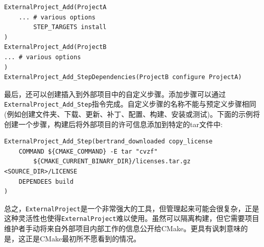 \begin{lstlisting}[style=styleCMake]
ExternalProject_Add(ProjectA
	... # various options
		STEP_TARGETS install
)
ExternalProject_Add(ProjectB
... # various options
)
ExternalProject_Add_StepDependencies(ProjectB configure ProjectA)
\end{lstlisting}

最后，还可以创建插入到外部项目中的自定义步骤。添加步骤可以通过\texttt{ExternalProject\_Add\_Step}指令完成。自定义步骤的名称不能与预定义步骤相同(例如创建文件夹、下载、更新、补丁、配置、构建、安装或测试)。下面的示例将创建一个步骤，构建后将外部项目的许可信息添加到特定的tar文件中:

\begin{lstlisting}[style=styleCMake]
ExternalProject_Add_Step(bertrand_downloaded copy_license
	COMMAND ${CMAKE_COMMAND} -E tar "cvzf"
		${CMAKE_CURRENT_BINARY_DIR}/licenses.tar.gz <SOURCE_DIR>/LICENSE
	DEPENDEES build
)
\end{lstlisting}

总之，\texttt{ExternalProject}是一个非常强大的工具，但管理起来可能会很复杂，正是这种灵活性也使得\texttt{ExternalProject}难以使用。虽然可以隔离构建，但它需要项目维护者手动将来自外部项目内部工作的信息公开给CMake。更具有讽刺意味的是，这正是CMake最初所不愿看到的情况。











